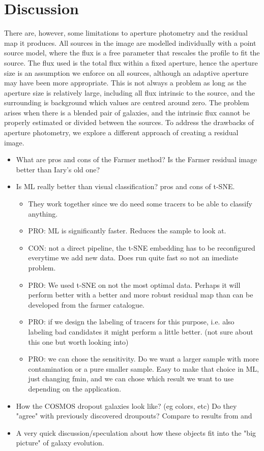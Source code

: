 \section{Discussion}

There are, however, some limitations to aperture photometry and the residual map it produces. All sources in the image are modelled individually with a point source model, where the flux is a free parameter that rescales the profile to fit the source. The flux used is the total flux within a fixed aperture, hence the aperture size is an assumption we enforce on all sources, although an adaptive aperture may have been more appropriate. This is not always a problem as long as the aperture size is relatively large, including all flux intrinsic to the source, and the surrounding is background which values are centred around zero. The problem arises when there is a  blended pair of galaxies, and the intrinsic flux cannot be properly estimated or divided between the sources. To address the drawbacks of aperture photometry, we explore a different approach of creating a residual image.

\begin{itemize}
    \item What are pros and cons of the Farmer method? Is the Farmer residual image better than Iary's old one?
    \item Is ML really better than visual classification? pros and cons of t-SNE.
    \begin{itemize}
        \item They work together since we do need some tracers to be able to classify anything.
        \item PRO: ML is significantly faster. Reduces the sample to look at.
        \item CON: not a direct pipeline, the t-SNE embedding has to be reconfigured everytime we add new data. Does run quite fast so not an imediate problem.
        \item PRO: We used t-SNE on not the most optimal data. Perhaps it will perform better with a better and more robust residual map than can be developed from the farmer catalogue.
        \item PRO: if we design the labeling of tracers for this purpose, i.e. also labeling bad candidates it might perform a little better. (not sure about this one but worth looking into)
        \item PRO: we can chose the sensitivity. Do we want a larger sample with more contamination or a pure smaller sample. Easy to make that choice in ML, just changing fmin, and we can chose which result we want to use depending on the application.
    \end{itemize}
    \item How the COSMOS dropout galaxies look like? (eg colors, etc) Do they "agree" with previously discovered droupouts? Compare to results from \cite{Wang_2019} and \cite{Alcalde_Pampliega_2019}
    \item A very quick discussion/speculation about how these objects fit into the "big picture" of galaxy evolution.
\end{itemize}


